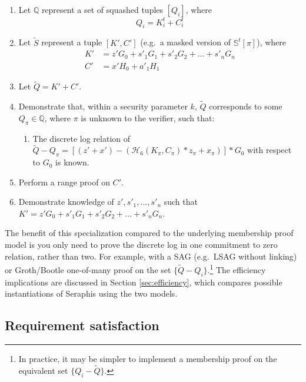 \begin{appendices}
\begin{enumerate}
    \item Let $\mathbb{Q}$ represent a set of squashed tuples $[Q_i]$, where\vspace{.115cm}
    \[Q_i = K^t_i + C^t_i\]

    \item Let $\tilde{S}$ represent a tuple $[K', C']$ (e.g.\ a masked version of $\mathbb{S}^t[\pi]$), where\vspace{.115cm}
    \begin{align*}
        K' &= z' G_0 + s'_1 G_1 + s'_2 G_2 + ... + s'_n G_n \\
        C' &= x' H_0 + a'_1 H_1
    \end{align*}

    \item Let $\tilde{Q} = K' + C'$.

    \item Demonstrate that, within a security parameter $k$, $\tilde{Q}$ corresponds to some $Q_{\pi} \in \mathbb{Q}$, where $\pi$ is unknown to the verifier, such that:
    \begin{enumerate}
        \item The discrete log relation of $\tilde{Q} - Q_{\pi} = [(z' + x') - (\mathcal{H}_6(K_{\pi}, C_{\pi})*z_{\pi} + x_{\pi})]*G_0$ with respect to $G_0$ is known.
    \end{enumerate}

    \item Perform a range proof on $C'$.

    \item Demonstrate knowledge of $z', s'_1,...,s'_n$ such that $K' = z' G_0 + s'_1 G_1 + s'_2 G_2 + ... + s'_n G_n$.
\end{enumerate}

The benefit of this specialization compared to the underlying membership proof model is you only need to prove the discrete log in one commitment to zero relation, rather than two. For example, with a SAG (e.g.\ LSAG \cite{Liu2004} without linking) or Groth/Bootle one-of-many proof on the set $\{\tilde{Q} - Q_i\}$.\footnote{In practice, it may be simpler to implement a membership proof on the equivalent set $\{Q_i - \tilde{Q}\}$.} The efficiency implications are discussed in Section \ref{sec:efficiency}, which compares possible instantiations of Seraphis using the two models.


\subsection{Requirement satisfaction}
\label{appendix:squashed-e-note-model-req-satisfaction}


\end{appendices}
